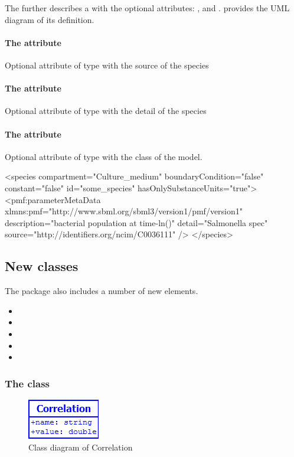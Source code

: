 \label{speciesmetadata-class}
The \SpeciesMetaData further describes a \Species with the optional attributes:
,  and . 
provides the UML diagram of its definition.

\paragraph{The  attribute}
Optional attribute of type  with the source of the species

\paragraph{The  attribute}
Optional attribute of type  with the detail of the species

\paragraph{The  attribute}
Optional attribute of type  with the class of the model.

\begin{example}
<species compartment="Culture_medium" boundaryCondition="false" constant="false"
  id="some_species" hasOnlySubstanceUnits="true">
  <pmf:parameterMetaData xlmns:pmf="http://www.sbml.org/sbml3/version1/pmf/version1"
    description="bacterial population at time-ln()" detail="Salmonella spec"
    source="http://identifiers.org/ncim/C0036111" />
</species>
\end{example}


\subsection{New classes}
The \Pmf package also includes a number of new elements.
\begin{itemize}
	\item \Correlation
	\item \DataSource
	\item \ModelVariable
	\item \Reference
	\item \UnitTransformation
\end{itemize}

\subsubsection{The  class}
\begin{figure}
	\includegraphics[scale=0.8]{img/Correlation}
	\caption{Class diagram of Correlation}
	\label{Correlation}
\end{figure}	

